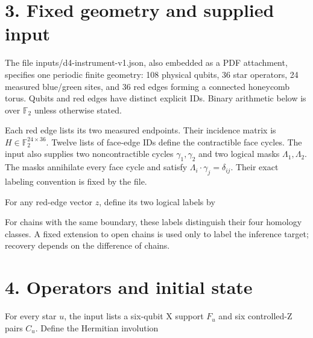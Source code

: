 \documentclass[11pt,letterpaper]{article}
\newcommand{\displayfit}[1]{\sbox{\mathbox}{$\displaystyle #1$}\ifdim\wd\mathbox>\linewidth\resizebox{\linewidth}{!}{\usebox{\mathbox}}\else\usebox{\mathbox}\fi}
\begin{document}
\section*{3. Fixed geometry and supplied input}

The file {\ttfamily\small inputs/d4-instrument-v1.json}, also embedded as a PDF attachment, specifies one periodic finite geometry: 108 physical qubits, 36 star operators, 24 measured blue/green sites, and 36 red edges forming a connected honeycomb torus. Qubits and red edges have distinct explicit IDs. Binary arithmetic below is over $\mathbb F_2$ unless otherwise stated.\par

Each red edge lists its two measured endpoints. Their incidence matrix is $H\in\mathbb F_2^{24\times36}$. Twelve lists of face-edge IDs define the contractible face cycles. The input also supplies two noncontractible cycles $\gamma_1,\gamma_2$ and two logical masks $\Lambda_1,\Lambda_2$. The masks annihilate every face cycle and satisfy $\Lambda_i\cdot\gamma_j=\delta_{ij}$. Their exact labeling convention is fixed by the file.\par


For any red-edge vector $z$, define its two logical labels by\par

\begin{center}\displayfit{\ell(z)=(\Lambda_1\cdot z,\Lambda_2\cdot z).}\end{center}

For chains with the same boundary, these labels distinguish their four homology classes. A fixed extension to open chains is used only to label the inference target; recovery depends on the difference of chains.\par

\section*{4. Operators and initial state}


For every star $u$, the input lists a six-qubit X support $F_u$ and six controlled-Z pairs $C_u$. Define the Hermitian involution\par

\begin{center}\displayfit{A_u=\left(\prod_{q\in F_u}X_q\right)\left(\prod_{(q,r)\in C_u}\mathrm{CZ}_{qr}\right).}\end{center}
\end{document}
